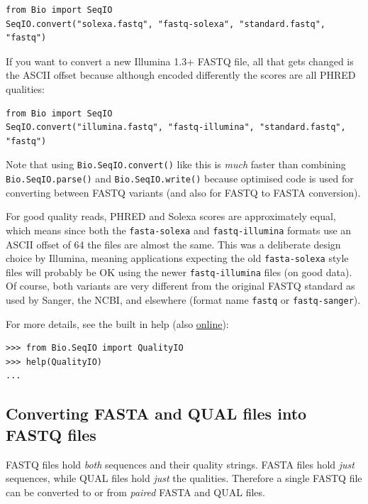 \documentclass{report}
\begin{document}
\begin{verbatim}
from Bio import SeqIO
SeqIO.convert("solexa.fastq", "fastq-solexa", "standard.fastq", "fastq")
\end{verbatim}

If you want to convert a new Illumina 1.3+ FASTQ file, all that gets changed
is the ASCII offset because although encoded differently the scores are all
PHRED qualities:

\begin{verbatim}
from Bio import SeqIO
SeqIO.convert("illumina.fastq", "fastq-illumina", "standard.fastq", "fastq")
\end{verbatim}

Note that using \verb|Bio.SeqIO.convert()| like this is \emph{much} faster
than combining \verb|Bio.SeqIO.parse()| and \verb|Bio.SeqIO.write()|
because optimised code is used for converting between FASTQ variants
(and also for FASTQ to FASTA conversion).

For good quality reads, PHRED and Solexa scores are approximately equal,
which means since both the \texttt{fasta-solexa} and \texttt{fastq-illumina}
formats use an ASCII offset of 64 the files are almost the same. This was a
deliberate design choice by Illumina, meaning applications expecting the old
\texttt{fasta-solexa} style files will probably be OK using the newer
\texttt{fastq-illumina} files (on good data). Of course, both variants are
very different from the original FASTQ standard as used by Sanger,
the NCBI, and elsewhere (format name \texttt{fastq} or \texttt{fastq-sanger}).

For more details, see the built in help (also \href{http://www.biopython.org/DIST/docs/api/Bio.SeqIO.QualityIO-module.html}{online}):

\begin{verbatim}
>>> from Bio.SeqIO import QualityIO
>>> help(QualityIO)
...
\end{verbatim}

\subsection{Converting FASTA and QUAL files into FASTQ files}
\label{sec:SeqIO-fasta-qual-conversion}

FASTQ files hold \emph{both} sequences and their quality strings.
FASTA files hold \emph{just} sequences, while QUAL files hold \emph{just}
the qualities. Therefore a single FASTQ file can be converted to or from
\emph{paired} FASTA and QUAL files.
\end{document}
